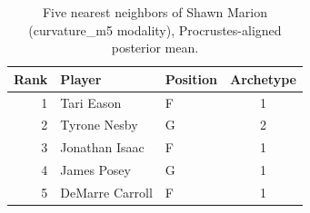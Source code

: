 \begin{table}[htbp]
  \centering\small
  \begin{tabular}{rllc}
    \toprule
    Rank & Player & Position & Archetype \\
    \midrule
    1 & Tari Eason & F & 1 \\
    2 & Tyrone Nesby & G & 2 \\
    3 & Jonathan Isaac & F & 1 \\
    4 & James Posey & G & 1 \\
    5 & DeMarre Carroll & F & 1 \\
    \bottomrule
  \end{tabular}
  \caption{Five nearest neighbors of Shawn Marion (curvature_m5 modality), Procrustes-aligned posterior mean.}
  \label{tab:Shawn_Marion_neighbors_curvature_m5}
\end{table}

